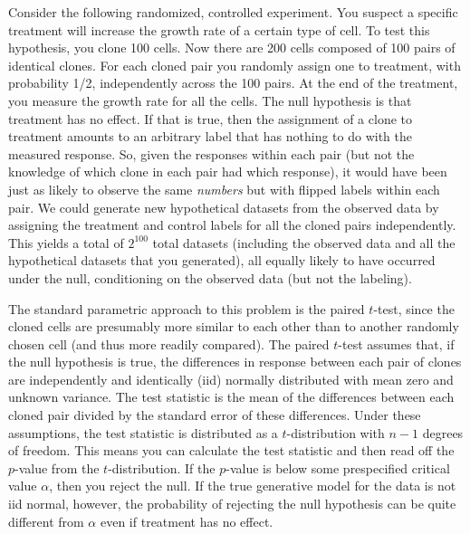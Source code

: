 

\begin{example}[label=exa:cont] Consider the following randomized, controlled
experiment.  You suspect a specific treatment will increase the growth rate of
a certain type of cell.  To test this hypothesis, you clone 100 cells. Now
there are 200 cells composed of 100 pairs of identical clones. For each cloned
pair you randomly assign one to treatment, with probability 1/2, independently
across the 100 pairs.  At the end of the treatment, you measure the growth rate
for all the cells.  The null hypothesis is that treatment has no effect.
If that is true, then the assignment of a clone to treatment amounts to an
arbitrary label that has nothing to do with the measured response.  So, given
the responses within each pair (but not the knowledge of which clone in each
pair had which response), it would have been just as likely to observe
the same \emph{numbers} but with flipped labels within each pair.
We could
generate new hypothetical datasets from the observed data by assigning the
treatment and control labels for all the cloned pairs independently.  This
yields a total of $2^{100}$ total datasets (including the observed data and all
the hypothetical datasets that you generated), all equally likely to have
occurred under the null, conditioning on the observed data (but not the labeling).

The standard parametric approach to this problem is the paired $t$-test, since
the cloned cells are presumably more similar to each other than to another
randomly chosen cell (and thus more readily compared).  The paired $t$-test
assumes that, if the null hypothesis is true, the differences in response
between each pair of clones are 
independently and identically (iid) normally distributed with mean zero and unknown variance.
The test statistic is the mean of the differences between each cloned pair
divided by the standard error of these differences.  
Under these assumptions, the test statistic is
distributed as a $t$-distribution with $n-1$ degrees of freedom.  This means you can
calculate the test statistic and then read off the $p$-value from the
$t$-distribution.  If the $p$-value is below some prespecified critical value
$\alpha$, then you reject the null.  
If the true generative model for the data is not iid normal, however, the
probability of rejecting the null hypothesis can be quite different from $\alpha$
even if treatment has no effect.


\end{example}
